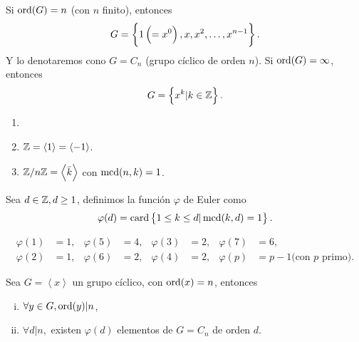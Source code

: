 \begin{obs}
    Si $\operatorname{ord}(G) = n$ (con $n$ finito), entonces
    \[
        G = \left\{ 1 \left( = x^0 \right), x, x^2, \dots, x^{n-1}\right\}.
    \]
    Y lo denotaremos cono $G = C_n$ (grupo cíclico de orden $n$).
    Si $\operatorname{ord}(G) = \infty$, entonces
    \[
        G = \left\{x^k \vert k \in \mathbb{Z}\right\}.
    \]
\end{obs}

\begin{example}
    \begin{enumerate}[1.]
        \item[]
        \item $\mathbb{Z} = \left< 1 \right> = \left< -1 \right>$.
        \item $\mathbb{Z}/n\mathbb{Z} = \left< \bar{k} \right>$ con $\operatorname{mcd}(n, k) = 1$.
    \end{enumerate}
\end{example}

\begin{defi}
    Sea $d \in \mathbb{Z}, d \geq 1$, definimos la función $\varphi$ de Euler como
    \[
        \varphi(d) = \operatorname{card} \left\{ 1 \leq k \leq d \vert \operatorname{mcd}(k, d) = 1\right\}.
    \]
\end{defi}

\begin{example}
    \begin{align*}
        \varphi(1) &= 1, & \varphi(5) &= 4, & \varphi(3) &= 2, & \varphi(7) &= 6, \\
        \varphi(2) &= 1, & \varphi(6) &= 2, & \varphi(4) &= 2, & \varphi(p) &= p-1 \text{(con } p \text{ primo).} 
    \end{align*}
\end{example}

\begin{prop}
    Sea $G = \left< x \right>$ un grupo cíclico, con $\operatorname{ord}(x) = n$, entonces
    \begin{enumerate}[i)]
        \item $\forall y \in G, \operatorname{ord}(y) \vert n$,
        \item $\forall d \vert n,$ existen $\varphi(d)$ elementos de $G = C_n$ de orden $d$.
    \end{enumerate}
\end{prop}

